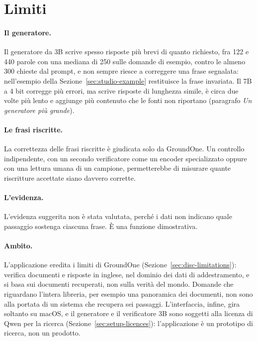 \section{Limiti}
\label{sec:studio-limits}

\paragraph{Il generatore.} Il generatore da 3B scrive spesso risposte più brevi di quanto richiesto, fra 122 e 440 parole con una mediana di 250 sulle domande di esempio, contro le almeno 300 chieste dal prompt, e non sempre riesce a correggere una frase segnalata: nell'esempio della Sezione~\ref{sec:studio-example} restituisce la frase invariata. Il 7B a 4 bit corregge più errori, ma scrive risposte di lunghezza simile, è circa due volte più lento e aggiunge più contenuto che le fonti non riportano (paragrafo \emph{Un generatore più grande}).

\paragraph{Le frasi riscritte.} La correttezza delle frasi riscritte è giudicata solo da GroundOne. Un controllo
indipendente, con un secondo verificatore come un encoder specializzato oppure con una lettura umana di un campione,
permetterebbe di misurare quante riscritture accettate siano davvero corrette.

\paragraph{L'evidenza.} L'evidenza suggerita non è stata valutata, perché i dati non indicano quale passaggio sostenga
ciascuna frase. È una funzione dimostrativa.

\paragraph{Ambito.} L'applicazione eredita i limiti di GroundOne (Sezione~\ref{sec:disc-limitations}): verifica documenti
e risposte in inglese, nel dominio dei dati di addestramento, e si basa sui documenti recuperati, non sulla verità del
mondo. Domande che riguardano l'intera libreria, per esempio una panoramica dei documenti, non sono alla portata di un
sistema che recupera sei passaggi. L'interfaccia, infine, gira soltanto su macOS, e il generatore e il verificatore 3B
sono soggetti alla licenza di Qwen per la ricerca (Sezione~\ref{sec:setup-licences}): l'applicazione è un prototipo di
ricerca, non un prodotto.

